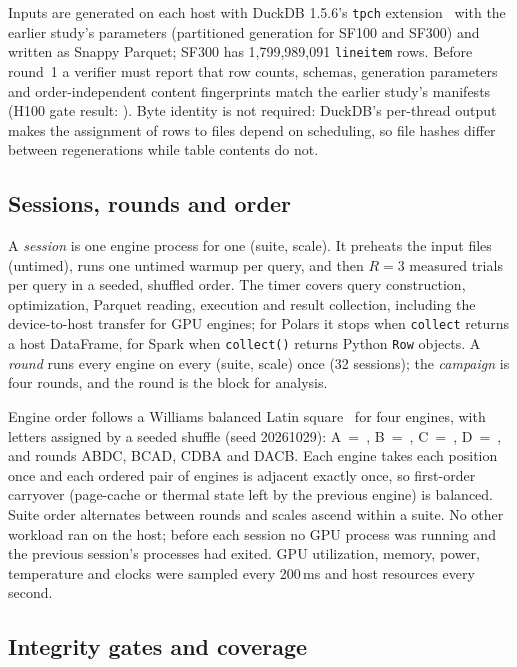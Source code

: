 \documentclass[sigconf, nonacm]{acmart}
\begin{document}
Inputs are generated on each host with DuckDB 1.5.6's \texttt{tpch}
extension~\citep{duckdb_tpch_ext} with the earlier study's parameters
(partitioned generation for SF100 and SF300) and written as Snappy Parquet; SF300
has 1,799,989,091 \texttt{lineitem} rows. Before round~1 a verifier must
report that row counts, schemas, generation parameters and order-independent
content fingerprints match the earlier study's manifests (H100 gate result:
). Byte identity is not required: DuckDB's per-thread
output makes the assignment of rows to files depend on scheduling, so file
hashes differ between regenerations while table contents do not.

\subsection{Sessions, rounds and order}
\label{sec:structure}

A \emph{session} is one engine process for one (suite, scale). It preheats the
input files (untimed), runs one untimed warmup per query, and then $R=3$
measured trials per query in a seeded, shuffled order. The timer covers query
construction, optimization, Parquet reading, execution and result collection,
including the device-to-host transfer for GPU engines; for Polars it stops when
\texttt{collect} returns a host DataFrame, for Spark when \texttt{collect()}
returns Python \texttt{Row} objects. A \emph{round} runs every engine on every
(suite, scale) once (32 sessions); the \emph{campaign} is four rounds, and the
round is the block for analysis.

Engine order follows a Williams balanced Latin square~\citep{williams1949latin}
for four engines, with letters assigned by a seeded shuffle (seed 20261029):
A~=~\sparkcpu{}, B~=~\polarsgpu{}, C~=~\polarscpu{}, D~=~\sparkgpu{}, and
rounds ABDC, BCAD, CDBA and DACB. Each engine takes each position once and
each ordered pair of engines is adjacent exactly once, so first-order carryover
(page-cache or thermal state left by the previous engine) is balanced. Suite
order alternates between rounds and scales ascend within a suite. No other
workload ran on the host; before each session no GPU process was running and
the previous session's processes had exited. GPU utilization, memory, power,
temperature and clocks were sampled every 200\,ms and host resources every
second.

\subsection{Integrity gates and coverage}
\label{sec:gates}
\end{document}
